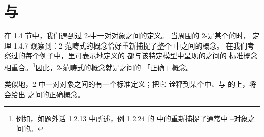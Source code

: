 \providecommand{\Fun}{\operatorname{Fun}}
\providecommand{\Cat}{\mathcal{C}at}
\providecommand{\QCat}{\mathcal{Q}\mathcal{C}at}
\providecommand{\sSet}{s\mathcal{S}et}
\providecommand{\qcOne}{\mathbf{1}}   %
\providecommand{\qcTwo}{\mathbf{2}}   %
\providecommand{\qcThree}{\mathbf{3}} %

\section{\trAdjunction{}与\trEquivalence}\label{sec:adjunctions-equivalences}

在 1.4 节中，我们遇到过 2-\trCategory{}中一对对象之间\emph{\trEquivalence}的定义。
当周围的 2-\trCategory{}是某个\trInfinityCosmos{}的\trHomotopyTwoCategory{}时，
定理 1.4.7 观察到：2-范畴式的\trEquivalence{}概念恰好重新捕捉了整个%
\trInfinityCosmos{}中\trInfinityCategory{}之间的\trEquivalence{}概念。
在我们考察过的每个\trInfinityCosmos{}例子中，\trInfinityCosmos{}里可表示地定义的%
\trEquivalence{}都与该特定模型中呈现的\trInfinityCategory{}之间\trEquivalence{}的
标准概念相重合。\footnote{例如，如题外话 1.2.13 中所述，例 1.2.24 的%
\trInfinityCosmos{}中的\trEquivalence{}重新捕捉了通常\trModelStructure{}中%
\trFibrant--\trCofibrant{}对象之间的\trWeakEquivalence{}。%
}因此，2-范畴式的\trEquivalence{}概念就是\trInfinityCategory{}之间\trEquivalence{}的
「正确」概念。

类似地，2-\trCategory{}中一对对象之间的\emph{\trAdjunction{}}有一个标准定义；把它
诠释到某个\trInfinityCosmos{}中\trInfinityCategory{}、\trFunctor{}与%
\trNaturalTransformation{}的\trHomotopyTwoCategory{}上，将会给出\trInfinityCategory{}%
之间\trAdjunction{}的正确概念。

